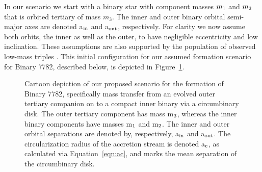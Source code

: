 \documentclass{aastex62}
\begin{document}
In our scenario we start with a binary star with component masses
$m_{\rm 1}$ and $m_{\rm 2}$ that is orbited tertiary of mass
$m_3$. The inner and outer binary orbital semi-major axes are denoted
a$_{\rm in}$ and a$_{\rm out}$, respectively.  For clarity we now
assume both orbits, the inner as well as the outer, to have negligible
eccentricity and low inclination.  These assumptions are also
supported by the population of observed low-mass triples
\cite{2010yCat..73890925T,moe18}.  This initial configuration for our
assumed formation scenario for Binary 7782, described below, is
depicted in Figure~\ref{fig:fig1}.

\begin{figure}[ht!]
\caption{Cartoon depiction of our proposed scenario for the formation
  of Binary 7782, specifically mass transfer from an evolved outer
  tertiary companion on to a compact inner binary via a circumbinary
  disk.  The outer tertiary component has mass m$_{\rm 3}$, whereas
  the inner binary components have masses m$_{\rm 1}$ and m$_{\rm 2}$.
  The inner and outer orbital separations are denoted by,
  respectively, a$_{\rm in}$ and a$_{\rm out}$.  The circularization
  radius of the accretion stream is denoted a$_{\rm c}$, as calculated
  via Equation~\ref{eqn:ac}, and marks the mean separation of the
  circumbinary disk.
\label{fig:fig1}}
\end{figure}
\end{document}
